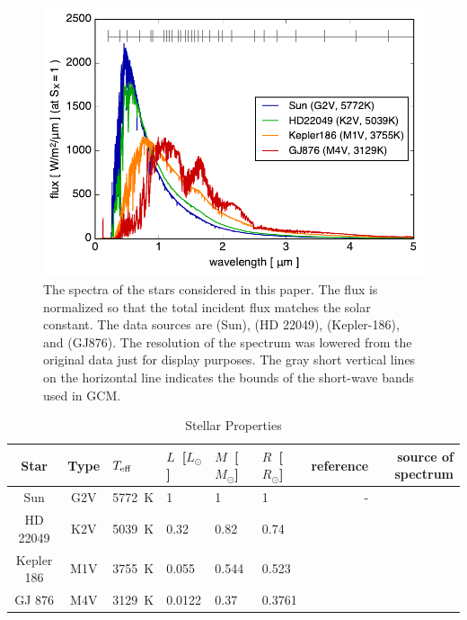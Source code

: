 \documentclass[11pt,numberedappendix,twocolappendix,]{emulateapj}
\begin{document}
\begin{figure}[!bh]
    \begin{center}
    \includegraphics[width=\hsize]{fig/star_spectra.pdf}
    \end{center}
\caption{The spectra of the stars considered in this paper. The flux is normalized so that the total incident flux matches the solar constant. The data sources are \citet{Kurucz1995} (Sun), \citet{Segura2003} (HD 22049), \citet{Allard2012} (Kepler-186), and \citet{Domagal-Goldman2014} (GJ876). The resolution of the spectrum was lowered from the original data just for display purposes. The gray short vertical lines on the horizontal line indicates the bounds of the short-wave bands used in GCM. }
\label{fig:star_spectra}
\end{figure}



\begin{table}[btp]
\caption{Stellar Properties}
\begin{center}
\begin{tabular}{ccllllrr} \hline \hline
%
Star & Type & $T_{\rm eff}$ & $L$~[$L_{\odot}$] & $M$~[$M_{\odot}$] & $R$~[$R_{\odot}$] & reference & source of spectrum \\ \hline
%
Sun & G2V & 5772~K & 1 & 1 & 1 & - & \citet{Kurucz1995} \\ 
%
HD 22049 & K2V & 5039~K & 0.32 & 0.82 & 0.74 & \citet{Baines2012} & \citet{Segura2003} \\
%
Kepler 186 & M1V & 3755~K & 0.055 & 0.544 & 0.523 & \citet{Torres2015} & \citet{Allard2012} \\
%
GJ 876 & M4V & 3129~K & 0.0122 & 0.37 & 0.3761 & \citet{vonBraun2014} & \citet{Domagal-Goldman2014} \\ \hline
\end{tabular}
\end{center}
\label{tbl:stellar_properties}
\end{table}%
\end{document}
